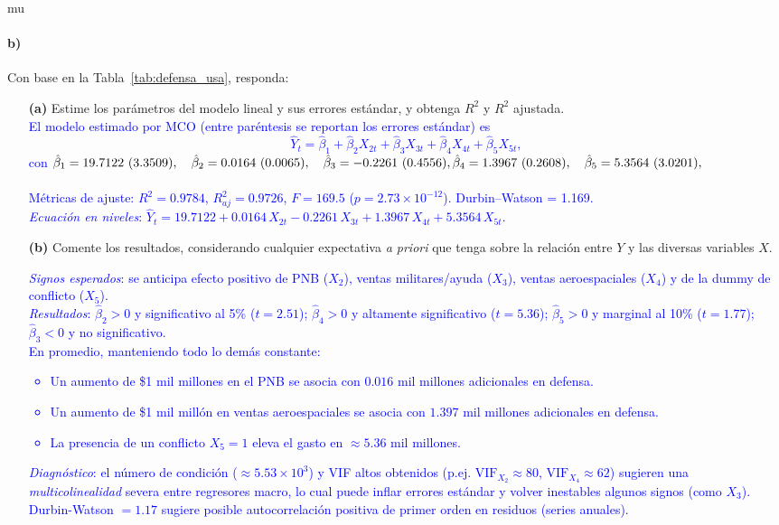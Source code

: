 mu\documentclass[10pt]{article}
\begin{document}
\paragraph*{b)} Con base en la Tabla~\ref{tab:defensa_usa}, responda:
\begin{enumerate}
    \item[\textbf{(a)}] Estime los parámetros del modelo lineal y sus errores estándar, y obtenga $R^2$ y $R^2$ ajustada.\\
    \textcolor{blue}{
        El modelo estimado por MCO (entre paréntesis se reportan los errores estándar) es
        \[
        \widehat{Y}_t=\hat{\beta}_1+\hat{\beta}_2X_{2t}+\hat{\beta}_3X_{3t}+\hat{\beta}_4X_{4t}+\hat{\beta}_5X_{5t},
        \]
        con
        $\hat{\beta}_1=19.7122\ (3.3509),\quad \hat{\beta}_2=0.0164\ (0.0065),\quad \hat{\beta}_3=-0.2261\ (0.4556),\\
        \hat{\beta}_4=1.3967\ (0.2608),\quad \hat{\beta}_5=5.3564\ (3.0201),$ \\
        \\
        Métricas de ajuste: \(R^2=0.9784\), \(R^2_{aj}=0.9726\), \(F=169.5\) (\(p=2.73\times10^{-12}\)). Durbin–Watson = 1.169.\\
        \textit{Ecuación en niveles}: \(\widehat{Y}_t=19.7122+0.0164\,X_{2t}-0.2261\,X_{3t}+1.3967\,X_{4t}+5.3564\,X_{5t}.\)
    }

    \item[\textbf{(b)}] Comente los resultados, considerando cualquier expectativa \textit{a priori}  que tenga sobre la relación entre $Y$ y las diversas variables $X$.\\
    \textcolor{blue}{
        \emph{Signos esperados}: se anticipa efecto positivo de PNB (\(X_2\)), ventas militares/ayuda (\(X_3\)), ventas aeroespaciales (\(X_4\)) y de la dummy de conflicto (\(X_5\)).\\
        \emph{Resultados}: \(\hat{\beta}_2>0\) y significativo al 5\% (\(t=2.51\)); \(\hat{\beta}_4>0\) y altamente significativo (\(t=5.36\)); \(\hat{\beta}_5>0\) y marginal al 10\% (\(t=1.77\)); \(\hat{\beta}_3<0\) y no significativo. \\
        En promedio, manteniendo todo lo demás constante:
        \begin{itemize}
        \item Un aumento de \$1 mil millones en el PNB se asocia con \(0.016\) mil millones adicionales en defensa.
        \item Un aumento de \$1 mil millón en ventas aeroespaciales se asocia con \(1.397\) mil millones adicionales en defensa.
        \item La presencia de un conflicto \(X_5=1\) eleva el gasto en \(\approx 5.36\) mil millones.
        \end{itemize}
        \emph{Diagnóstico}: el número de condición (\(\approx 5.53\times10^3\)) y VIF altos obtenidos (p.ej. \(\text{VIF}_{X_2}\approx 80\), \(\text{VIF}_{X_4}\approx 62\)) sugieren  una \textit{multicolinealidad} severa entre regresores macro, lo cual puede inflar errores estándar y volver inestables algunos signos (como \(X_3\)). Durbin-Watson \(=1.17\) sugiere posible autocorrelación positiva de primer orden en residuos (series anuales).
    }


\end{enumerate}
\end{document}
